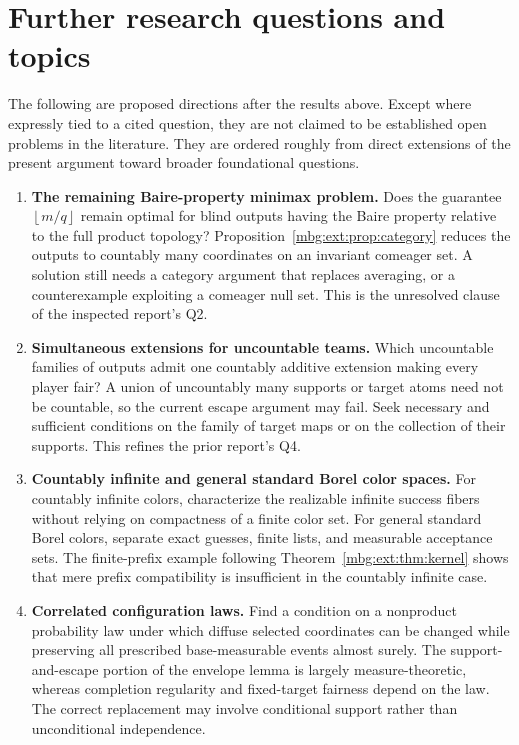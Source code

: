 \documentclass[11pt,letterpaper]{article}
\theoremstyle{definition}
\newcommand{\floor}[1]{\left\lfloor #1\right\rfloor}
\begin{document}
\section{Further research questions and topics}
\label{mbg:ext:sec:questions}

The following are proposed directions after the results above. Except where expressly tied to a cited question, they are not claimed to be established open problems in the literature. They are ordered roughly from direct extensions of the present argument toward broader foundational questions.

\begin{enumerate}[label=\textbf{R\arabic*.},leftmargin=2.9em,itemsep=0.7em]
\item \textbf{The remaining Baire-property minimax problem.}
Does the guarantee $\floor{m/q}$ remain optimal for blind outputs having the Baire property relative to the full product topology? Proposition~\ref{mbg:ext:prop:category} reduces the outputs to countably many coordinates on an invariant comeager set. A solution still needs a category argument that replaces averaging, or a counterexample exploiting a comeager null set. This is the unresolved clause of the inspected report's Q2.

\item \textbf{Simultaneous extensions for uncountable teams.}
Which uncountable families of outputs admit one countably additive extension making every player fair? A union of uncountably many supports or target atoms need not be countable, so the current escape argument may fail. Seek necessary and sufficient conditions on the family of target maps or on the collection of their supports. This refines the prior report's Q4.

\item \textbf{Countably infinite and general standard Borel color spaces.}
For countably infinite colors, characterize the realizable infinite success fibers without relying on compactness of a finite color set. For general standard Borel colors, separate exact guesses, finite lists, and measurable acceptance sets. The finite-prefix example following Theorem~\ref{mbg:ext:thm:kernel} shows that mere prefix compatibility is insufficient in the countably infinite case.

\item \textbf{Correlated configuration laws.}
Find a condition on a nonproduct probability law under which diffuse selected coordinates can be changed while preserving all prescribed base-measurable events almost surely. The support-and-escape portion of the envelope lemma is largely measure-theoretic, whereas completion regularity and fixed-target fairness depend on the law. The correct replacement may involve conditional support rather than unconditional independence.


\end{enumerate}
\end{document}
